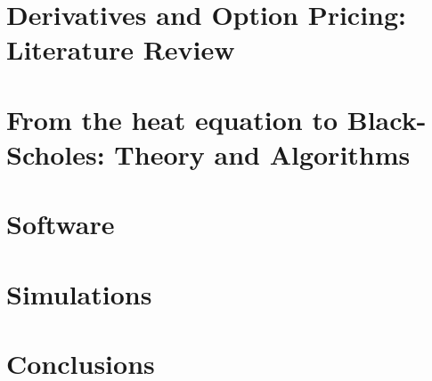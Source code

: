 \documentclass[a4paper,12pt]{report}
\begin{document}
\chapter{Derivatives and Option Pricing: Literature Review}
\label{sec:literature}


\chapter{From the heat equation to Black-Scholes: Theory and Algorithms}\label{sec:theory_and_background}

   
\chapter{Software}\label{sec:software}
%


\chapter{Simulations}\label{sec:simulations}
%

\chapter{Conclusions}\label{sec:conclusions}
% 
        
%        


\pagebreak



% 
\end{document}
